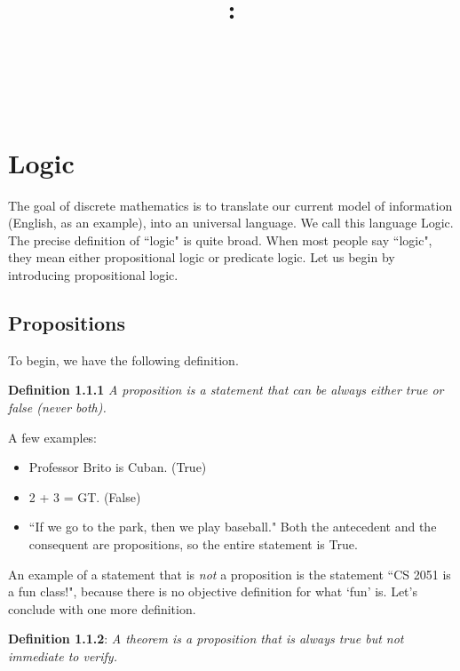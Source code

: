 \documentclass{article}
\title{
    \vspace{2in}
    \textbf{\lectClass:\\ \lectTitle}\\
    \vspace{0.1in}\large{\textit{\lectClassInstructor\ \lectSection}}
    \vspace{3in}
    \author{\textbf{\lectAuthorName}}
    \date{}
}
\begin{document}
\maketitle
\pagebreak

\section{Logic}

The goal of discrete mathematics is to translate our current model of information (English, as an example), into an universal language. We call this language Logic. The precise definition of ``logic" is quite broad. When most people say ``logic", they mean either propositional logic or predicate logic. Let us begin by introducing propositional logic.

\subsection{Propositions}
    To begin, we have the following definition.
    
    \vspace{1.5mm}
    \textbf{Definition 1.1.1} \textit{A proposition is a statement that can be always either true or false  (never both).}
    
    \vspace{1.5mm}
    A few examples:
    \begin{itemize}[itemsep = 0.2mm, parsep = 5pt, topsep = 5pt]
        \item Professor Brito is Cuban. (True)
        \item 2 + 3 = GT. (False)
        \item ``If we go to the park, then we play baseball." Both the antecedent and the consequent are propositions, so the entire statement is True.
    \end{itemize}
    
    An example of a statement that is \textit{not} a proposition  is the statement ``CS 2051 is a fun class!", because there is no objective definition for what `fun' is. Let's conclude with one more definition.
    
    \vspace{1.5mm}
    \textbf{Definition 1.1.2}: \textit{A theorem is a proposition that is always true but not immediate to verify.}
\end{document}
